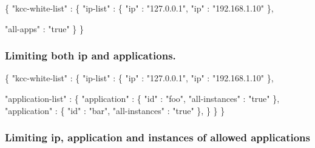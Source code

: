 \begin{DoxyCode}
\{
  \textcolor{stringliteral}{"kcc-white-list"} : \{
    \textcolor{stringliteral}{"ip-list"}      : \{
      \textcolor{stringliteral}{"ip"} : \textcolor{stringliteral}{"127.0.0.1"},
      \textcolor{stringliteral}{"ip"} : \textcolor{stringliteral}{"192.168.1.10"}
    \},

    \textcolor{stringliteral}{"all-apps"} : \textcolor{stringliteral}{"true"}
  \}
\}
\end{DoxyCode}


\subsubsection*{Limiting both ip and applications.}


\begin{DoxyCode}
\{
  \textcolor{stringliteral}{"kcc-white-list"} : \{
    \textcolor{stringliteral}{"ip-list"}      : \{
      \textcolor{stringliteral}{"ip"} : \textcolor{stringliteral}{"127.0.0.1"},
      \textcolor{stringliteral}{"ip"} : \textcolor{stringliteral}{"192.168.1.10"}
    \},

    \textcolor{stringliteral}{"application-list"} : \{
      \textcolor{stringliteral}{"application"} : \{
        \textcolor{stringliteral}{"id"}            : \textcolor{stringliteral}{"foo"},
        \textcolor{stringliteral}{"all-instances"} : \textcolor{stringliteral}{"true"}
      \},
      \textcolor{stringliteral}{"application"} : \{
        \textcolor{stringliteral}{"id"}            : \textcolor{stringliteral}{"bar"},
        \textcolor{stringliteral}{"all-instances"} : \textcolor{stringliteral}{"true"}
      \},
    \}
  \}
\}
\end{DoxyCode}


\subsubsection*{Limiting ip, application and instances of allowed applications}


